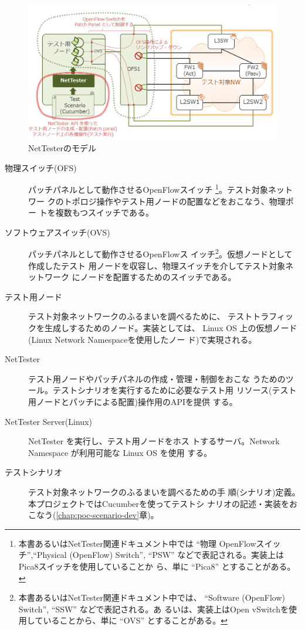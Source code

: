 \begin{figure}[h]
 \centering
 \includegraphics[scale=0.6]{img/model-nettester.png}
 \caption{NetTesterのモデル}
 \label{fig:model-nettester}
\end{figure}


\begin{description}
 \item[物理スイッチ(OFS)] パッチパネルとして動作させるOpenFlowスイッチ
            \footnote{本書あるいはNetTester関連ドキュメント中では ``物理
            OpenFlowスイッチ'',``Physical (OpenFlow) Switch'', ``PSW''
            などで表記される。実装上はPica8スイッチを使用していることか
            ら、単に ``Pica8'' とすることがある。}。テスト対象ネットワー
            クのトポロジ操作やテスト用ノードの配置などをおこなう、物理ポー
            トを複数もつスイッチである。
 \item[ソフトウェアスイッチ(OVS)] パッチパネルとして動作させるOpenFlowス
            イッチ\footnote{本書あるいはNetTester関連ドキュメント中では、
            ``Software (OpenFlow) Switch'', ``SSW'' などで表記される。あ
            るいは、実装上はOpen vSwitchを使用していることから、単に
            ``OVS'' とすることがある。}。仮想ノードとして作成したテスト
            用ノードを収容し、物理スイッチを介してテスト対象ネットワーク
            にノードを配置するためのスイッチである。
 \item[テスト用ノード] テスト対象ネットワークのふるまいを調べるために、
            テストトラフィックを生成しするためのノード。実装としては、
            Linux OS 上の仮想ノード(Linux Network Namespaceを使用したノー
            ド)で実現される。
 \item[NetTester] テスト用ノードやパッチパネルの作成・管理・制御をおこな
            うためのツール。テストシナリオを実行するために必要なテスト用
            リソース(テスト用ノードとパッチによる配置)操作用のAPIを提供
            する。
 \item[NetTester Server(Linux)] NetTester を実行し、テスト用ノードをホス
            トするサーバ。Network Namespace が利用可能な Linux OS を使用
            する。
 \item[テストシナリオ] テスト対象ネットワークのふるまいを調べるための手
            順(シナリオ)定義。本プロジェクトではCucumberを使ってテストシ
            ナリオの記述・実装をおこなう(\ref{chap:poc-scenario-dev}章)。
\end{description}

